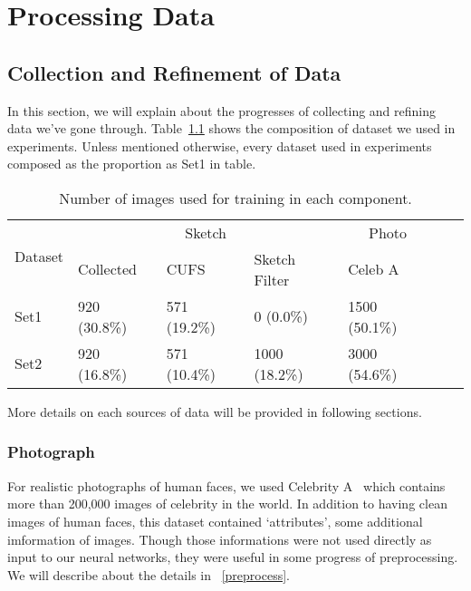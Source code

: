 \chapter{Processing Data}\label{Ch:process_data}


\section{Collection and Refinement of Data}
In this section, we will explain about the progresses of collecting and refining data we've gone through. 
Table~\ref{TABLE:composition} shows the composition of dataset we used in experiments. Unless mentioned otherwise, every dataset used in experiments composed as the proportion as Set1 in table.

\begin{table}[h]
    \begin{center}
        \begin{tabular}{|l|l|l|l|l|l|l|}
          \hline
          \multirow{2}{*}{Dataset} &
            \multicolumn{3}{c}{Sketch} &
            \multicolumn{1}{c|}{Photo}\\
          & Collected & CUFS & Sketch Filter & Celeb A\\
          \hline
          Set1 & 920 (30.8\%) & 571 (19.2\%) & 0 (0.0\%) & 1500 (50.1\%) \\
          \hline
          Set2 & 920 (16.8\%) & 571 (10.4\%) & 1000 (18.2\%) & 3000 (54.6\%) \\
          \hline
        \end{tabular}
    \end{center}
    \caption{Number of images used for training in each component.}\label{TABLE:composition}
\end{table}

More details on each sources of data will be provided in following sections.

\subsection{Photograph}

For realistic photographs of human faces, we used Celebrity A~\cite{liu2015faceattributes} which contains more than 200,000 images of celebrity in the world. In addition to having clean images of human faces, this dataset contained `attributes', some additional imformation of images. Though those informations were not used directly as input to our neural networks, they were useful in some progress of preprocessing. We will describe about the details in ~\ref{preprocess}.

